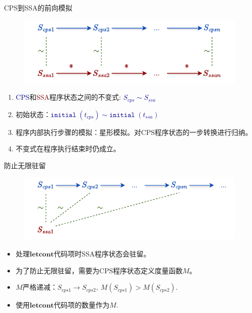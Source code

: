 \begin{frame}{CPS到SSA的前向模拟}
    \begin{figure}
        \centering
        \includegraphics[width=0.65\linewidth]{figures/star.drawio.pdf}
    \end{figure}
    \begin{enumerate}
    \item \textcolor{DarkBlue}{CPS}和\textcolor{Maroon}{SSA}程序状态之间的不变式: \textcolor{DarkBlue}{$S_{cps}\sim S_{ssa}$}
    \item 初始状态：\textcolor{DarkBlue}{$\mathtt{initial}\; (t_{cps}) \sim \mathtt{initial}\; (t_{ssa})$}
    \item 程序内部执行步骤的模拟：星形模拟。对CPS程序状态的一步转换进行归纳。
    \item 不变式在程序执行结束时仍成立。
\end{enumerate}
\end{frame}

\begin{frame}{防止无限驻留}  
    \begin{figure}
        \centering
        \includegraphics[width=0.65\linewidth]{figures/stutter.drawio.pdf}
    \end{figure}
    \begin{itemize}
        \item 处理$\mathbf{letcont}$代码项时SSA程序状态会驻留。
        \item 为了防止无限驻留，需要为CPS程序状态定义度量函数$M$。
        \item $M$严格递减：$S_{cps1}\rightarrow S_{cps2},\  M(S_{cps1})>M(S_{cps2})$.
        \item 使用$\mathbf{letcont}$代码项的数量作为$M$.
    \end{itemize}
\end{frame}

